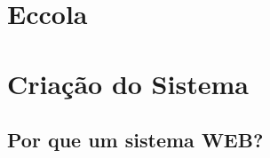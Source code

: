 \label{desenvolvimento}
\section{Eccola}

\section{Criação do Sistema}

\subsection{Por que um sistema WEB?}

